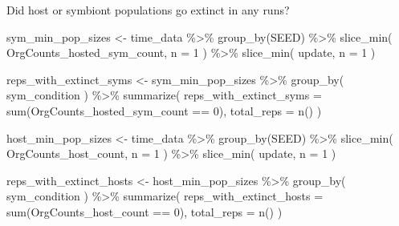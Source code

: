 \documentclass[
]{book}
\newenvironment{Shaded}{\begin{snugshade}}{\end{snugshade}}
\newcommand{\AttributeTok}[1]{\textcolor[rgb]{0.77,0.63,0.00}{#1}}
\newcommand{\DecValTok}[1]{\textcolor[rgb]{0.00,0.00,0.81}{#1}}
\newcommand{\FunctionTok}[1]{\textcolor[rgb]{0.00,0.00,0.00}{#1}}
\newcommand{\NormalTok}[1]{#1}
\newcommand{\OtherTok}[1]{\textcolor[rgb]{0.56,0.35,0.01}{#1}}
\newcommand{\SpecialCharTok}[1]{\textcolor[rgb]{0.00,0.00,0.00}{#1}}
\begin{document}
Did host or symbiont populations go extinct in any runs?

\begin{Shaded}
\begin{Highlighting}[]
\NormalTok{sym\_min\_pop\_sizes }\OtherTok{\textless{}{-}}\NormalTok{ time\_data }\SpecialCharTok{\%\textgreater{}\%}
  \FunctionTok{group\_by}\NormalTok{(SEED) }\SpecialCharTok{\%\textgreater{}\%}
  \FunctionTok{slice\_min}\NormalTok{(}
\NormalTok{    OrgCounts\_hosted\_sym\_count,}
    \AttributeTok{n =} \DecValTok{1}
\NormalTok{  ) }\SpecialCharTok{\%\textgreater{}\%}
  \FunctionTok{slice\_min}\NormalTok{(}
\NormalTok{    update,}
    \AttributeTok{n =} \DecValTok{1}
\NormalTok{  )}

\NormalTok{reps\_with\_extinct\_syms }\OtherTok{\textless{}{-}}\NormalTok{ sym\_min\_pop\_sizes }\SpecialCharTok{\%\textgreater{}\%}
  \FunctionTok{group\_by}\NormalTok{(}
\NormalTok{    sym\_condition}
\NormalTok{  ) }\SpecialCharTok{\%\textgreater{}\%}
  \FunctionTok{summarize}\NormalTok{(}
    \AttributeTok{reps\_with\_extinct\_syms =} \FunctionTok{sum}\NormalTok{(OrgCounts\_hosted\_sym\_count }\SpecialCharTok{==} \DecValTok{0}\NormalTok{),}
    \AttributeTok{total\_reps =} \FunctionTok{n}\NormalTok{()}
\NormalTok{  )}

\NormalTok{host\_min\_pop\_sizes }\OtherTok{\textless{}{-}}\NormalTok{ time\_data }\SpecialCharTok{\%\textgreater{}\%}
  \FunctionTok{group\_by}\NormalTok{(SEED) }\SpecialCharTok{\%\textgreater{}\%}
  \FunctionTok{slice\_min}\NormalTok{(}
\NormalTok{    OrgCounts\_host\_count,}
    \AttributeTok{n =} \DecValTok{1}
\NormalTok{  ) }\SpecialCharTok{\%\textgreater{}\%}
  \FunctionTok{slice\_min}\NormalTok{(}
\NormalTok{    update,}
    \AttributeTok{n =} \DecValTok{1}
\NormalTok{  )}

\NormalTok{reps\_with\_extinct\_hosts }\OtherTok{\textless{}{-}}\NormalTok{ host\_min\_pop\_sizes }\SpecialCharTok{\%\textgreater{}\%}
  \FunctionTok{group\_by}\NormalTok{(}
\NormalTok{    sym\_condition}
\NormalTok{  ) }\SpecialCharTok{\%\textgreater{}\%}
  \FunctionTok{summarize}\NormalTok{(}
    \AttributeTok{reps\_with\_extinct\_hosts =} \FunctionTok{sum}\NormalTok{(OrgCounts\_host\_count }\SpecialCharTok{==} \DecValTok{0}\NormalTok{),}
    \AttributeTok{total\_reps =} \FunctionTok{n}\NormalTok{()}
\NormalTok{  )}


\end{Highlighting}
\end{Shaded}
\end{document}
